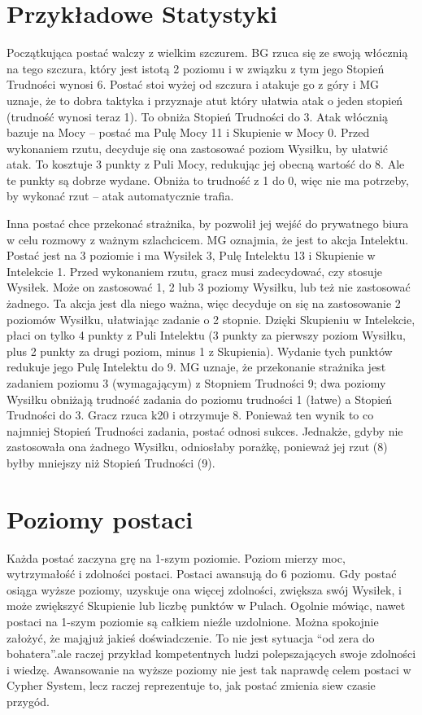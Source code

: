 \section{Przykładowe Statystyki}

Początkująca postać walczy z wielkim szczurem. BG rzuca się ze swoją włócznią na tego szczura, który jest istotą 2 poziomu i w związku z tym jego Stopień Trudności wynosi 6. Postać stoi wyżej od szczura i atakuje go z góry i MG uznaje, że to dobra taktyka i przyznaje atut który ułatwia atak o jeden stopień (trudność wynosi teraz 1). To obniża Stopień Trudności do 3. Atak włócznią bazuje na Mocy – postać ma Pulę Mocy 11 i Skupienie w Mocy 0. Przed wykonaniem rzutu, decyduje się ona zastosować poziom Wysiłku, by ułatwić atak. To kosztuje 3 punkty z Puli Mocy, redukując jej obecną wartość do 8. Ale te punkty są dobrze wydane. Obniża to trudność z 1 do 0, więc nie ma potrzeby, by wykonać rzut – atak automatycznie trafia.  

Inna postać chce przekonać strażnika, by pozwolił jej wejść do prywatnego biura w celu rozmowy z ważnym szlachcicem. MG oznajmia, że jest to akcja Intelektu. Postać jest na 3 poziomie i ma Wysiłek 3, Pulę Intelektu 13 i Skupienie w Intelekcie 1. Przed wykonaniem rzutu, gracz musi zadecydować, czy stosuje Wysiłek. Może on zastosować 1, 2 lub 3 poziomy Wysiłku, lub też nie zastosować żadnego. Ta akcja jest dla niego ważna, więc decyduje on się na zastosowanie 2 poziomów Wysiłku, ułatwiając zadanie o 2 stopnie. Dzięki Skupieniu w Intelekcie, płaci on tylko 4 punkty z Puli Intelektu (3 punkty za pierwszy poziom Wysiłku, plus 2 punkty za drugi poziom, minus 1 z Skupienia). Wydanie tych punktów redukuje jego Pulę Intelektu do 9. MG uznaje, że przekonanie strażnika jest zadaniem poziomu 3 (wymagającym) z Stopniem Trudności 9; dwa poziomy Wysiłku obniżają trudność zadania do poziomu trudności 1 (łatwe) a Stopień Trudności do 3. Gracz rzuca k20 i otrzymuje 8. Ponieważ ten wynik to co najmniej Stopień Trudności zadania, postać odnosi sukces. Jednakże, gdyby nie zastosowała ona żadnego Wysiłku, odniosłaby porażkę, ponieważ jej rzut (8) byłby mniejszy niż Stopień Trudności (9).

\section{Poziomy postaci}

Każda postać zaczyna grę na 1-szym poziomie. Poziom mierzy moc, wytrzymałość i zdolności postaci. Postaci awansują do 6 poziomu. Gdy postać osiąga wyższe poziomy, uzyskuje ona więcej zdolności, zwiększa swój Wysiłek, i może zwiększyć Skupienie lub liczbę punktów w Pulach. Ogolnie mówiąc, nawet postaci na 1-szym poziomie są całkiem nieźle uzdolnione. Można spokojnie założyć, że mająjuż jakieś doświadczenie. To nie jest sytuacja “od zera do bohatera”.ale raczej przykład kompetentnych ludzi polepszających swoje zdolności i wiedzę. Awansowanie na wyższe poziomy nie jest tak naprawdę celem postaci w Cypher System, lecz raczej reprezentuje to, jak postać zmienia siew czasie przygód.

